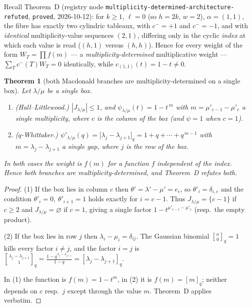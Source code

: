 \documentclass[11pt]{article}
\theoremstyle{plain}
\newtheorem{theorem}{Theorem}
\theoremstyle{definition}
\begin{document}
Recall Theorem~D (registry node \texttt{multiplicity-determined-architecture-refuted},
\texttt{proved}, 2026-10-12): for $k\ge1$, $\ell=0$ (so $h=2k$, $w=2$), $\alpha=(1,1)$, the
fibre has exactly two cylindric tableaux, with $c^-=+1$ and $c^-=-1$, and with
\emph{identical} multiplicity-value sequences $(2,1)$, differing only in the cyclic
\emph{index} at which each value is read ($(h,1)$ versus $(h,h)$). Hence for every weight of
the form $W_T=\prod f(m)$ --- a \emph{multiplicity-determined} multiplicative weight ---
$\sum_T c^-(T)W_T=0$ identically, while $c_{(1,1)}(t)=1-t\neq0$.

\begin{theorem}[both Macdonald branches are multiplicity-determined on a single box]
\label{thm:bothbranches}
Let $\lambda/\mu$ be a single box.
\begin{enumerate}
\item \emph{(Hall--Littlewood.)} $|J_{\lambda/\mu}|\le 1$, and
$\psi_{\lambda/\mu}(t)=1-t^{\,m}$ with $m=\mu'_{c-1}-\mu'_{c}$ a single multiplicity, where
$c$ is the column of the box (and $\psi=1$ when $c=1$).
\item \emph{($q$-Whittaker.)}
$\psi'_{\lambda/\mu}(q)=\bigl[\lambda_j-\lambda_{j+1}\bigr]_q
=1+q+\cdots+q^{\,m-1}$ with $m=\lambda_j-\lambda_{j+1}$ a single gap, where $j$ is the row
of the box.
\end{enumerate}
In both cases the weight is $f(m)$ for a function $f$ \emph{independent of the index}. Hence
both branches are multiplicity-determined, and Theorem~D refutes both.
\end{theorem}

\begin{proof}
(1) If the box lies in column $c$ then $\theta'=\lambda'-\mu'=e_c$, so $\theta'_i=\delta_{i,c}$
and the condition $\theta'_i=0,\ \theta'_{i+1}=1$ holds exactly for $i=c-1$. Thus
$J_{\lambda/\mu}=\{c-1\}$ if $c\ge2$ and $J_{\lambda/\mu}=\varnothing$ if $c=1$, giving a
single factor $1-t^{\mu'_{c-1}-\mu'_c}$ (resp.\ the empty product).

(2) If the box lies in row $j$ then $\lambda_i-\mu_i=\delta_{ij}$. The Gaussian binomial
$\genfrac[]{0pt}{}{a}{0}_q=1$ kills every factor $i\neq j$, and the factor $i=j$ is
$\genfrac[]{0pt}{}{\lambda_j-\lambda_{j+1}}{1}_q
=\frac{1-q^{\lambda_j-\lambda_{j+1}}}{1-q}=[\lambda_j-\lambda_{j+1}]_q$.

In (1) the function is $f(m)=1-t^m$, in (2) it is $f(m)=[m]_q$; neither depends on $c$
resp.\ $j$ except through the value $m$. Theorem~D applies verbatim.
\end{proof}
\end{document}
